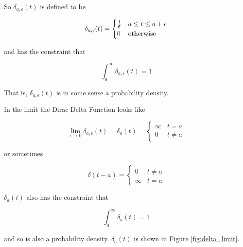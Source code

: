 \documentclass{article}
\begin{document}
\bigskip
\noindent
So $\delta_{a,\epsilon}(t)$ is defined to be

\begin{equation*}
\delta_{a,\epsilon}(t) =  
 \begin{cases} 
      \frac{1}{\mathlarger {\epsilon}} & a \leq t \leq a + \epsilon \\
      0                                               & \text{otherwise}
   \end{cases}
\label{eqn:delta}
\end{equation*}

\noindent
\bigskip
and has the constraint that


\begin{equation*}
  \int_{0}^{\infty} \delta_{a,\epsilon}(t) =  1
\end{equation*}

\bigskip
\bigskip
\noindent
\bigskip
That is, $\delta_{a,\epsilon}(t)$ is in some sense a probability density.

\bigskip
\noindent
In the limit the Dirac Delta Function looks like

\begin{equation*}
\lim_{\epsilon \to 0} \delta_{a,\epsilon}(t) =
\delta_{a}(t) =  
 \begin{cases} 
     \infty & t = a\\
      0     & t \neq a
   \end{cases}
\end{equation*}

\bigskip
\noindent
or sometimes

\begin{equation*}
\delta (t - a) =  
  \begin{cases} 
     0 & t \neq a\\
      \infty     & t = a
  \end{cases}
\end{equation*}

\bigskip
\noindent
$\delta_a(t)$ also has the constraint that 


\begin{equation*}
  \int_{0}^{\infty} \delta_{a}(t) =  1
\end{equation*}

\bigskip
\noindent
and so is also a probability density. $\delta_a(t)$  is shown in Figure \ref{fig:delta_limit}.
\end{document}
